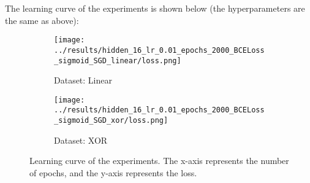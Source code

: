 The learning curve of the experiments is shown below (the hyperparameters are the same as above):

\begin{figure}[H]
    \centering
    \begin{subfigure}[b]{0.45\textwidth}
        \centering
        \texttt{[image: ../results/hidden\_16\_lr\_0.01\_epochs\_2000\_BCELoss\_sigmoid\_SGD\_linear/loss.png]}
        \caption{Dataset: Linear}
    \end{subfigure}
    \begin{subfigure}[b]{0.45\textwidth}
        \centering
        \texttt{[image: ../results/hidden\_16\_lr\_0.01\_epochs\_2000\_BCELoss\_sigmoid\_SGD\_xor/loss.png]}
        \caption{Dataset: XOR}
    \end{subfigure}
    \caption{Learning curve of the experiments. The x-axis represents the number of epochs, and the y-axis represents the loss.}
\end{figure}
